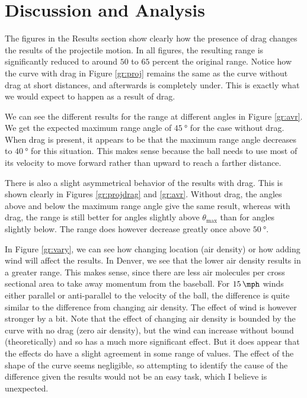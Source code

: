 \documentclass[aps,prl,twocolumn,superscriptaddress]{revtex4-1}
\begin{document}
\section{Discussion and Analysis}
The figures in the Results section show clearly how the presence of drag changes the results of the projectile motion. In all figures, the resulting range is significantly reduced to around $50$ to $65$ percent the original range. Notice how the curve with drag in Figure \ref{gr:proj} remains the same as the curve without drag at short distances, and afterwards is completely under. This is exactly what we would expect to happen as a result of drag. 

We can see the different results for the range at different angles in Figure \ref{gr:avr}. We get the expected maximum range angle of $\SI{45}{\degree}$ for the case without drag. When drag is present, it appears to be that the maximum range angle decreases to $\SI{40}{\degree}$ for this situation. This makes sense because the ball needs to use most of its velocity to move forward rather than upward to reach a farther distance.

There is also a slight asymmetrical behavior of the results with drag. This is shown clearly in Figures \ref{gr:projdrag} and \ref{gr:avr}. Without drag, the angles above and below the maximum range angle give the same result, whereas with drag, the range is still better for angles slightly above $\theta_{\text{max}}$ than for angles slightly below. The range does however decrease greatly once above $\SI{50}{\degree}$.

In Figure \ref{gr:vary}, we can see how changing location (air density) or how adding wind will affect the results. In Denver, we see that the lower air density results in a greater range. This makes sense, since there are less air molecules per cross sectional area to take away momentum from the baseball. For $\SI{15}{\mph}$ winds either parallel or anti-parallel to the velocity of the ball, the difference is quite similar to the difference from changing air density. The effect of wind is however stronger by a bit. Note that the effect of changing air density is bounded by the curve with no drag (zero air density), but the wind can increase without bound (theoretically) and so has a much more significant effect. But it does appear that the effects do have a slight agreement in some range of values. The effect of the shape of the curve seems negligible, so attempting to identify the cause of the difference given the results would not be an easy task, which I believe is unexpected.
\end{document}
